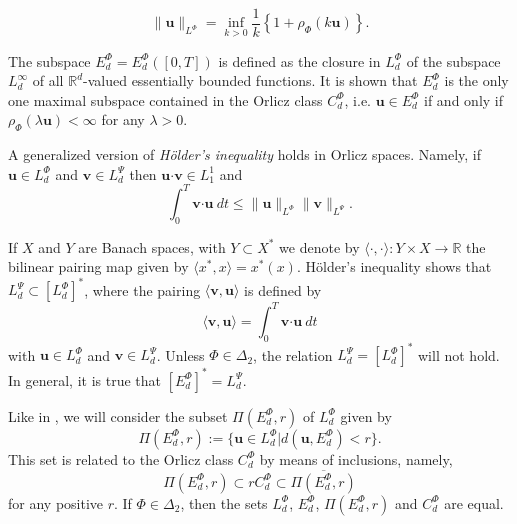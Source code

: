 \documentclass[twoside]{article}
\theoremstyle{remark}
\newcommand{\orlnor}{\|_{L^{\Phi}}}
\newcommand{\lphi}{L^{\Phi}}
\newcommand{\lpsi}{L^{\Psi}}
\newcommand{\ephi}{E^{\Phi}}
\newcommand{\claseor}{C^{\Phi}}
\renewcommand{\b}[1]{\boldsymbol{#1}}
\newcommand{\ccdot}{\b{\cdot}}
\renewcommand{\leq}{\leqslant}
\begin{document}
\begin{equation}\label{amemiya}
\|\b{u}\orlnor=\inf\limits_{k>0}\frac{1}{k}\left\{1+\rho_{\Phi}(k\b{u})\right\}.
\end{equation}



The subspace $\ephi_d=\ephi_d([0,T])$ is defined as the closure in $\lphi_d$ of the subspace $L^{\infty}_d$ of all $\mathbb{R}^d$-valued essentially bounded functions. It is shown that  $\ephi_d$ is the only one maximal subspace contained in the Orlicz class $\claseor_d$, i.e. 
$\b{u}\in\ephi_d$ if and only if $\rho_{\Phi}(\lambda \b{u})<\infty$ for any $\lambda>0$.  

A generalized version of \emph{H\"older's inequality} holds in Orlicz spaces. Namely, if $\b{u}\in\lphi_d$ and $\b{v}\in\lpsi_d$ then $\b{u}\ccdot\b{v}\in L_1^1$ and
\begin{equation}\label{holder}
\int_0^T\b{v}\ccdot\b{u}\ dt\leq \|\b{u}\orlnor\|\b{v}\|_{L^{\Psi}}.
\end{equation}




If $X$ and $Y$ are  Banach spaces, with $Y\subset X^*$ we denote by $\langle\cdot,\cdot\rangle:Y\times X\to\mathbb{R}$ the bilinear pairing  map given by $\langle x^*,x\rangle=x^*(x)$. H\"older's inequality shows that $\lpsi_d\subset \left[\lphi_d\right]^*$, where the pairing  
$\langle \b{v}, \b{u}\rangle$
is defined by 
\begin{equation}\label{pairing}
  \langle \b{v},\b{u}\rangle=\int_0^T\b{v}\ccdot\b{u}\ dt
\end{equation}
with  $\b{u}\in\lphi_d$ and $\b{v}\in\lpsi_d$.
 Unless $\Phi \in \Delta_2$, the relation $\lpsi_d= \left[\lphi_d\right]^*$ will not hold. In general, it is true  that  $\left[\ephi_d\right]^*=\lpsi_d$.


Like in \cite{KR}, we will consider the subset $\Pi(\ephi_d,r)$ of $\lphi_d$ given by
\[\Pi(\ephi_d,r):=\{\b{u}\in\lphi_d| d(\b{u},\ephi_d)<r\}.\]
This set is related to the Orlicz class $\claseor_d$ by means of inclusions, namely,
\begin{equation}\label{inclusiones}\Pi(\ephi_d, r )\subset r \claseor_d\subset\overline{\Pi(\ephi_d,r)}
\end{equation}
for any positive $r$.
If $\Phi \in \Delta_2$,  then the sets $\lphi_d$, $\ephi_d$, $\Pi(\ephi_d,r)$ and $\claseor_d$ are equal.

\end{document}
